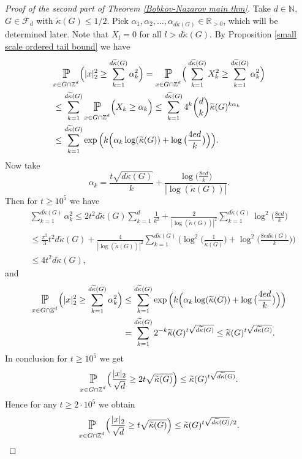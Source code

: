 \documentclass[10pt,a4paper]{amsart}
\numberwithin{equation}{section}
\newcommand{\Pro}{\mathop{\mathbb{P}}}
\newcommand{\Z}{\mathbb{Z}}
\newcommand{\R}{\mathbb{R}}
\newcommand{\N}{\mathbb{N}}
\newcommand{\spr}[1]{\underset{_{\substack{#1}}}{\mathlarger{\mathlarger{\Pro}}}}
\begin{document}
\begin{proof}[Proof of the second part of Theorem \ref{Bobkov-Nazarov main thm}] Take $d \in \N$, $G \in \mathcal{F}_d$ with $\widetilde{\kappa}(G) \le 1/2$. Pick $\alpha_1,\alpha_2,\ldots, \alpha_{d\widetilde{\kappa}(G)} \in \R_{>0}$, which will be determined later. Note that $X_l=0$ for all $l>d\widetilde{\kappa}(G)$. By Proposition \ref{small scale ordered tail bound} we have 
\begin{align*}
    &\spr{ x \in G \cap \Z^d}\Big(|x|_2^2 \ge \sum_{k=1}^{d\widetilde{\kappa}(G)} \alpha_k^2 \Big)=\spr{ x \in G \cap \Z^d}\Big(\sum_{k=1}^{d\widetilde{\kappa}(G)} X_k^2 \ge \sum_{k=1}^{d\widetilde{\kappa}(G)} \alpha_k^2 \Big) \\
    &\le \sum_{k=1}^{d\widetilde{\kappa}(G)} \spr{ x \in G \cap \Z^d}\Big(  X_k \ge  \alpha_k \Big) \le \sum_{k=1}^{d\widetilde{\kappa}(G)} 4^k \binom{d}{k} \widetilde{\kappa}(G)^{k\alpha_k} \\
    &\le \sum_{k=1}^{d\widetilde{\kappa}(G)} \exp \Big( k \Big( \alpha_k \log (\widetilde{\kappa}(G))+  \log \big( \frac{4ed}{k} \big) \Big) \Big).
\end{align*}
Now take 
\[
\alpha_k= \frac{t\sqrt{d\widetilde{\kappa}(G)}}{k}+\frac{\log \big( \frac{8ed}{k} \big)}{|\log(\widetilde{\kappa}(G))|}.
\]
Then for $t \ge 10^5$ we have
\begin{align*}
    &\sum_{k=1}^{d\widetilde{\kappa}(G)} \alpha_k^2 \le 2 t^2d\widetilde{\kappa}(G)\sum_{k=1}^d \frac{1}{k^2}+\frac{2}{|\log(\widetilde{\kappa}(G))|^2} \sum_{k=1}^{d \widetilde{\kappa}(G)} \log^2\Big(\frac{8ed}{k}\Big) \\
    &\le \frac{\pi^2}{3} t^2 d \widetilde{\kappa}(G)+ \frac{4}{|\log(\widetilde{\kappa}(G))|^2} \sum_{k=1}^{d \widetilde{\kappa}(G)}\Big(\log^2\Big( \frac{1}{\widetilde{\kappa}(G)}\Big)+ \log^2\Big( \frac{8e d \widetilde{\kappa}(G)}{k}\Big) \Big) \\
    &\le 4 t^2 d\widetilde{\kappa}(G),
\end{align*}
and
\begin{align*}
    \spr{x \in G \cap \Z^d} \Big(|x|_2^2 \ge \sum_{k=1}^{d\widetilde{\kappa}(G)} \alpha_k^2 \Big) &\le \sum_{k=1}^{d\widetilde{\kappa}(G)} \exp \Big( k \Big( \alpha_k \log (\widetilde{\kappa}(G))+  \log \big( \frac{4ed}{k} \big) \Big) \Big) \\
    & = \sum_{k=1}^{d \widetilde{\kappa}(G)} 2^{-k} \widetilde{\kappa}(G)^{t \sqrt{d\widetilde{\kappa}(G)}}  \le\widetilde{\kappa}(G)^{t \sqrt{d\widetilde{\kappa}(G)}}.
\end{align*}
 In conclusion for $t \ge 10^5$ we get
\begin{align*}
   \spr{x \in G \cap \Z^d} \Big( \frac{|x|_2}{\sqrt{d}} \ge 2t \sqrt{\widetilde{\kappa}(G) }\Big) \le  \widetilde{\kappa}(G)^{t \sqrt{d \widetilde{\kappa}(G)}}.
\end{align*}
Hence for any $t \ge 2 \cdot 10^5$ we obtain
\begin{align*}
    \spr{x \in G \cap \Z^d} \Big( \frac{|x|_2}{\sqrt{d}} \ge t  \sqrt{\widetilde{\kappa}(G) } \Big) \le  \widetilde{\kappa}(G)^{ t\sqrt{d\widetilde{\kappa}(G)}/2}.
\end{align*}
\end{proof}
\end{document}
